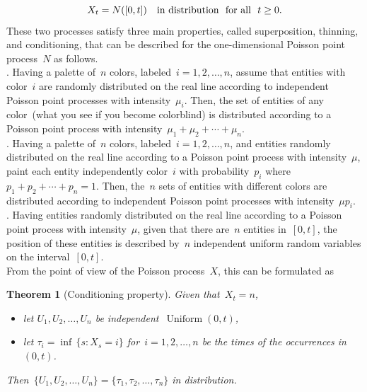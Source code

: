 \documentclass[letterpaper,11pt,twoside,keywordsasfootnote,addressatend,noinfoline]{article}
\newtheorem{theorem}{Theorem}
\DeclareMathOperator{\uniform}{Uniform}
\begin{document}
 $$ X_t = N ([0, t]) \quad \hbox{in distribution \ for all \ $t \geq 0$}. $$
 These two processes satisfy three main properties, called superposition, thinning, and conditioning, that can be described for the one-dimensional Poisson point process~$N$ as follows. \vspace*{4pt} \\
.
 Having a palette of~$n$ colors, labeled~$i = 1, 2, \ldots, n$, assume that entities with color~$i$ are randomly distributed on the real line according to independent Poisson point processes with intensity~$\mu_i$.
 Then, the set of entities of any color~(what you see if you become colorblind) is distributed according to a Poisson point process with intensity~$\mu_1 + \mu_2 + \cdots + \mu_n$. \vspace*{4pt} \\
.
 Having a palette of~$n$ colors, labeled~$i = 1, 2, \ldots, n$, and entities randomly distributed on the real line according to a Poisson point process with intensity~$\mu$, paint each entity independently color~$i$ with probability~$p_i$ where~$p_1 + p_2 + \cdots + p_n = 1$.
 Then, the~$n$ sets of entities with different colors are distributed according to independent Poisson point processes with intensity~$\mu p_i$. \vspace*{4pt} \\
.
 Having entities randomly distributed on the real line according to a Poisson point process with intensity~$\mu$, given that there are~$n$ entities in~$[0, t]$, the position of these entities is described by~$n$ independent uniform random variables on the interval~$[0, t]$. \vspace*{4pt} \\
 From the point of view of the Poisson process~$X$, this can be formulated as
\begin{theorem}[Conditioning property]
\label{th:poisson}
 Given that~$X_t = n$,
\begin{itemize}
\item let $U_1, U_2, \ldots, U_n$ be independent~$\uniform (0, t)$, \vspace*{4pt}
\item let $\tau_i = \inf \,\{s : X_s = i \}$ for~$i = 1, 2, \ldots, n$ be the times of the occurrences in~$(0, t)$.
\end{itemize}
 Then~$\{U_1, U_2, \ldots, U_n \} = \{\tau_1, \tau_2, \ldots, \tau_n \}$ in distribution.
\end{theorem}
\noindent
\end{document}
